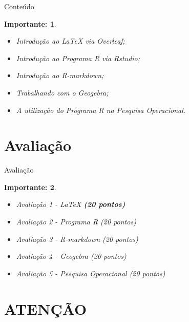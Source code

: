 \documentclass{beamer}
\newtheorem{teoc}{Importante:} %
\begin{document}

\begin{frame}{Conteúdo}
    
	\begin{teoc}
        \begin{itemize}
			\item Introdução ao LaTeX via Overleaf;
			\item Introdução ao Programa R via Rstudio;
			\item Introdução ao R-markdown;
			\item Trabalhando com o Geogebra;
			\item A utilização do Programa R na Pesquisa Operacional.
		\end{itemize}
	\end{teoc}
	
\end{frame}


\section{Avaliação}

\begin{frame}{Avaliação}
    
	\begin{teoc}
        \begin{itemize}
			\item Avaliação 1 - LaTeX \textbf{(20 pontos)}
			\item Avaliação 2 - Programa R (20 pontos)
			\item Avaliação 3 - R-markdown (20 pontos)
			\item Avaliação 4 - Geogebra (20 pontos)
			\item Avaliação 5 - Pesquisa Operacional (20 pontos)
		\end{itemize}
	\end{teoc}
	
\end{frame}


\section{ATENÇÃO}
\end{document}
